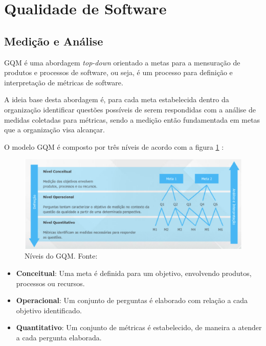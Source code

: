 \section{Qualidade de Software}

\subsection{Medição e Análise}

GQM é uma abordagem \textit{top-down} orientado a metas para a mensuração de produtos e processos de software, ou seja, é um processo para definição e interpretação de métricas de software. \cite{junior}

A ideia base desta abordagem é, para cada meta estabelecida dentro da organização identificar questões possíveis de serem respondidas com a análise de medidas coletadas para métricas, sendo a medição então fundamentada em metas que a organização visa alcançar.

O modelo GQM é composto por três níveis de acordo com a figura \ref{fig:gqm} \cite{junior}:

\begin{figure}[h!]
	\centering
  \includegraphics[keepaspectratio=true,scale=0.5]{figuras/gqm.eps}
  \caption[Níveis do GQM.]{Níveis do GQM. Fonte: \cite{junior}}
	\label{fig:gqm}
\end{figure}

\begin{itemize}
  \item \textbf{Conceitual}: Uma meta é definida para um objetivo, envolvendo produtos, processos ou recursos.
  \item \textbf{Operacional}: Um conjunto de perguntas é elaborado com relação a cada objetivo identificado.
  \item \textbf{Quantitativo}: Um conjunto de métricas é estabelecido, de maneira a atender a cada pergunta elaborada.
\end{itemize}

